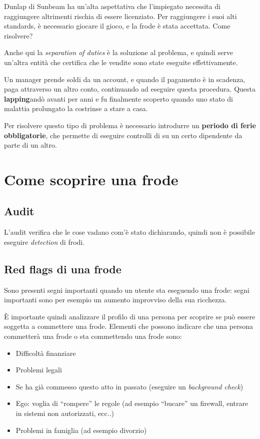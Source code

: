 
Dunlap di Sunbeam ha un'alta aspettativa che l'impiegato necessita di 
raggiungere altrimenti rischia di essere licenziato. Per raggiungere i suoi 
alti standards, è necessario giocare il gioco, e la frode è stata accettata. 
Come risolvere? 

Anche qui la \textit{separation of duties} è la soluzione al problema, e quindi 
serve un'altra entità che certifica che le vendite sono state eseguite 
effettivamente.


Un manager prende soldi da un account, e quando il pagamento è in scadenza, 
paga attraverso un altro conto, continuando ad eseguire questa procedura. 
Questa \textbf{lapping}andò avanti per anni e fu finalmente scoperto quando uno 
stato di malattia prolungato la costrinse a stare a casa.

Per risolvere questo tipo di problema è necessario introdurre un 
\textbf{periodo di ferie obbligatorie}, che permette di eseguire controlli di 
su un certo dipendente da parte di un altro.

\section{Come scoprire una frode}

\subsection{Audit}

L'audit verifica che le cose vadano com'è stato dichiarando, quindi non è 
possibile eseguire \textit{detection} di frodi.

\subsection{Red flags di una frode}
Sono presenti segni importanti quando un utente sta eseguendo una frode: segni 
importanti sono per esempio un aumento improvviso della sua ricchezza.

È importante quindi analizzare il profilo di una persona per scoprire se può 
essere soggetta a commettere una frode. Elementi che possono indicare che una 
persona commetterà una frode o sta commettendo una frode sono:
\begin{itemize}
	\item Difficoltà finanziare
	\item Problemi legali
	\item Se ha già commesso questo atto in passato (eseguire un 
	\textit{background check})
	\item Ego: voglia di ``rompere'' le regole (ad esempio ``bucare'' un 
	firewall, entrare in sistemi non autorizzati, ecc..)
	\item Problemi in famiglia (ad esempio divorzio)
\end{itemize}

